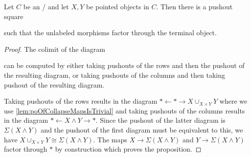 \begin{lemma}\label{lem:poSqWithFactoringTerminal}
    Let $C$ be an \inftytop/ and let $X,Y$ be pointed objects in $C$. 
    Then there is a pushout square
    \begin{center}
    \end{center}
    such that the unlabeled morphisms factor through the terminal object.
    \begin{proof}
        The colimit of the diagram 
        \begin{center}
        \end{center}
        can be computed by either taking pushouts of the rows and then the pushout of the resulting diagram, or taking pushouts of the columns and then taking pushout of the resulting diagram.
        
        Taking pushouts of the rows results in the diagram $*\xleftarrow{}*\rightarrow X\cup_{X\times Y} Y$ where we use \cref{lem:poOfCollapseMapsIsTrivial} and taking pushouts of the columns results in the diagram $*\xleftarrow{}X\wedge Y\rightarrow *$. 
        Since the pushout of the latter diagram is $\Sigma\left(X\wedge Y\right)$ and the pushout of the first diagram must be equivalent to this, we have $X\cup_{X\times Y} Y\cong\Sigma\left(X\wedge Y\right)$.
        The maps $X\to\Sigma\left(X\wedge Y\right)$ and $Y\to\Sigma\left(X\wedge Y\right)$ factor through $*$ by construction which proves the proposition.
    \end{proof}
\end{lemma}
